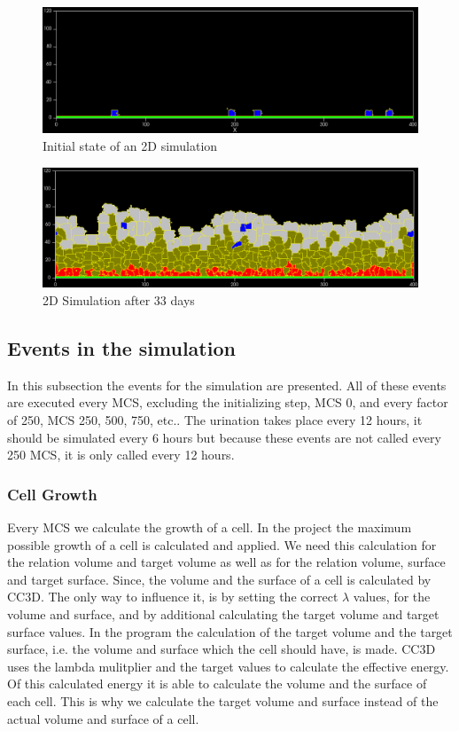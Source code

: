 \begin{figure}
	\center
	\includegraphics[scale=0.35]{figures/2DSimulation-InitialState.png}
	\caption{Initial state of an 2D simulation}
	\label{img:2DSimulationInitialState}
\end{figure}

\begin{figure}
	\center
	\includegraphics[scale=0.35]{figures/2DSimulation-33Days.png}
	\caption{2D Simulation after 33 days}
	\label{img:2DSimulation33Days}
\end{figure}

\subsection{Events in the simulation}
In this subsection the events for the simulation are presented. All of these events are executed every \ac{MCS}, excluding the initializing step, \ac{MCS} 0, and every factor of 250, \ac{MCS} 250, 500, 750, etc.. \newline
The urination takes place every 12 hours, it should be simulated every 6 hours but because these events are not called every 250 \ac{MCS}, it is only called every 12 hours.

\subsubsection{Cell Growth}
Every \ac{MCS} we calculate the growth of a cell. In the project the maximum possible growth of a cell is calculated and applied.  We need this calculation for the relation volume and target volume as well as for the relation volume, surface and target surface. Since, the volume and the surface of a cell is calculated by \ac{CC3D}. The only way to influence it, is by setting the correct $\lambda$ values, for the volume and surface, and by additional calculating the target volume and target surface values. In the program the calculation of the target volume and the target surface, i.e. the volume and surface which the cell should have, is made. \ac{CC3D} uses the lambda mulitplier and the target values to calculate the effective energy. Of this calculated energy it is able to calculate the volume and the surface of each cell. This is why we calculate the target volume and surface instead of the actual volume and surface of a cell.

